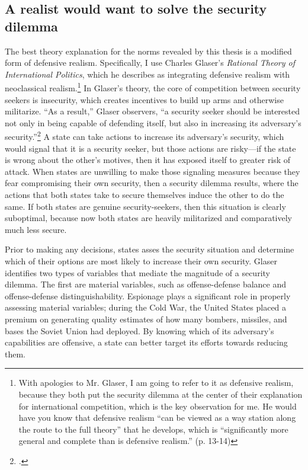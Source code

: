 \documentclass[11pt]{memoir}
\begin{document}
\begin{refsegment}
\subsection{A realist would want to solve the security dilemma}
The best theory explanation for the norms revealed by this thesis is a modified form of defensive realism. Specifically, I use Charles Glaser's \emph{Rational Theory of International Politics}, which he describes as integrating defensive realism with neoclassical realism.\footnote{With apologies to Mr. Glaser, I am going to refer to it as defensive realism, because they both put the security dilemma at the center of their explanation for international competition, which is the key observation for me. He would have you know that defensive realism ``can be viewed as a way station along the route to the full theory'' that he develops, which is ``significantly more general and complete than is defensive realism.'' (p. 13-14)} In Glaser's theory, the core of competition between security seekers is insecurity, which creates incentives to build up arms and otherwise militarize. ``As a result,'' Glaser observers, ``a security seeker should be interested not only in being capable of defending itself, but also in increasing its adversary's security.''\footcite[p.~7]{glaser_rational_2010} A state can take actions to increase its adversary's security, which would signal that it is a security seeker, but those actions are risky---if the state is wrong about the other's motives, then it has exposed itself to greater risk of attack. When states are unwilling to make those signaling measures because they fear compromising their own security, then a security dilemma results, where the actions that both states take to secure themselves induce the other to do the same. If both states are genuine security-seekers, then this situation is clearly suboptimal, because now both states are heavily militarized and comparatively much less secure.

Prior to making any decisions, states asses the security situation and determine which of their options are most likely to increase their own security. Glaser identifies two types of variables that mediate the magnitude of a security dilemma. The first are material variables, such as offense-defense balance and offense-defense distinguishability. Espionage plays a significant role in properly assessing material variables; during the Cold War, the United States placed a premium on generating quality estimates of how many bombers, missiles, and bases the Soviet Union had deployed. By knowing which of its adversary's capabilities are offensive, a state can better target its efforts towards reducing them.


\end{refsegment}
\end{document}
